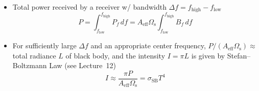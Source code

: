\documentclass[11pt, oneside]{article}
\newcommand{\Aeff}{A_\mathrm{eff}}
\begin{document}
\begin{itemize}
\begin{itemize}
\begin{equation*}
		\end{equation*}
		and
		\begin{equation}
			\label{e:Pf2}
			P_f = B_f\Aeff\Omega_\mathrm{s}
		\end{equation}
		\item[$\hookrightarrow$] Total power received by a receiver w/ bandwidth $\Delta f = f_\mathrm{high} - f_\mathrm{low}$
		\begin{equation}
			\label{e:Ptot}
			P = \int_{f_\mathrm{low}}^{f_\mathrm{high}} P_f\,df = \Aeff\Omega_\mathrm{s}\int_{f_\mathrm{low}}^{f_\mathrm{high}} B_f\,df
		\end{equation}
		\item[$\hookrightarrow$] For sufficiently large $\Delta f$ and an appropriate center frequency, $P/(\Aeff\Omega_\mathrm{s}) \approx$ total radiance $L$ of black body, and the intensity $I = \pi L$ is given by Stefan--Boltzmann Law (see Lecture~12)
		\begin{equation}
			\label{e:SB}
			I \approx \frac{\pi P}{\Aeff\Omega_\mathrm{s}} = \sigma_\mathrm{SB}T^4

\end{equation}
\end{itemize}
\end{itemize}
\end{document}
